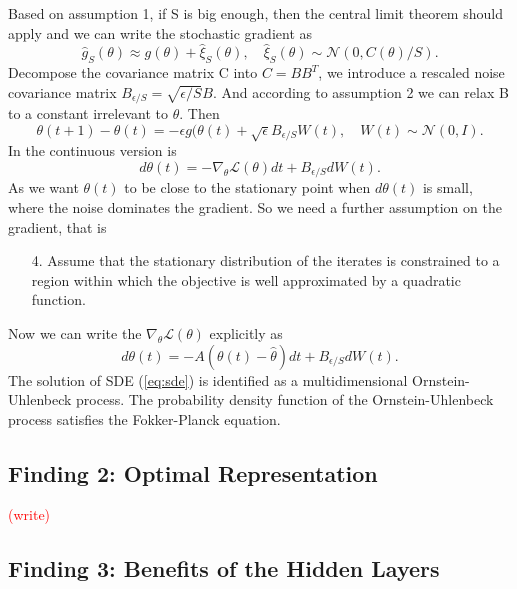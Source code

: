 \documentclass[11pt]{article}
\newcommand\myworries[1]{\textcolor{red}{(#1)}}
\begin{document}
Based on assumption 1, if S is big enough, then the central limit theorem should apply and we can write the stochastic gradient as
\begin{equation}
\hat g_S(\theta) \approx g(\theta) + \hat \xi_S(\theta), \quad \hat \xi_S(\theta)\sim \mathcal N(0,C(\theta)/S).
\end{equation}
Decompose the covariance matrix C into $C = BB^T$, we introduce a rescaled noise covariance matrix $B_{\epsilon/S} = \sqrt{\epsilon/S}B$. And according to assumption 2 we can relax B to a constant irrelevant to $\theta$.
Then 
\begin{equation}
\theta(t+1) - \theta(t) = -\epsilon g(\theta(t) + \sqrt{\epsilon} B_{\epsilon/S}W(t), \quad W(t)\sim \mathcal N(0,I).
\end{equation}
In the continuous version is 
\begin{equation}
d\theta(t) = -\nabla_\theta \mathcal L (\theta)dt + B_{\epsilon/S} dW(t).
\end{equation}
As we want $\theta(t)$ to be close to the stationary point when $d\theta(t)$ is small, where the noise dominates the gradient. So we need a further assumption on the gradient, that is 

\begin{itemize}
\item[4.] Assume that the stationary distribution of the iterates is constrained to a region within which the objective is well approximated by a quadratic function. 
\end{itemize}
Now we can write the $\nabla_\theta \mathcal L (\theta)$ explicitly as 
\begin{equation}
d\theta(t) = -A(\theta(t)-\hat \theta)dt + B_{\epsilon/S} dW(t).
\label{eq:sde}
\end{equation}
The solution of SDE (\ref{eq:sde}) is identified as a multidimensional Ornstein-Uhlenbeck process. The probability density function of the Ornstein-Uhlenbeck process satisfies the Fokker-Planck equation.

\subsection*{Finding 2: Optimal Representation}

\myworries{write}

\subsection*{Finding 3: Benefits of the Hidden Layers}
\end{document}
